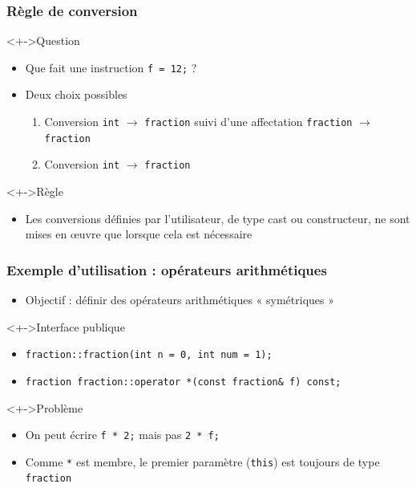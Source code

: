 \begin{frame}
\frametitle{Règle de conversion}
\begin{exampleblock}<+->{Question}
	\begin{itemize}[<+->]
	\item Que fait une instruction \texttt{f = 12;} ?
	\end{itemize}
\end{exampleblock}
\begin{itemize}[<+->]
\item Deux choix possibles
	\begin{enumerate}
	\item Conversion \lstinline|int| $\rightarrow$ \texttt{fraction} suivi d'une affectation \texttt{fraction} $\rightarrow$ \texttt{fraction}
	\item Conversion \lstinline|int| $\rightarrow$ \texttt{fraction}
	\end{enumerate}
\end{itemize}
\begin{alertblock}<+->{Règle}
	\begin{itemize}[<+->]
	\item Les conversions définies par l'utilisateur, de type cast ou constructeur, ne sont mises en œuvre que lorsque cela est nécessaire
	\end{itemize}
\end{alertblock}
\end{frame}

\begin{frame}
\frametitle{Exemple d'utilisation : opérateurs arithmétiques}
\begin{itemize}[<+->]
\item Objectif : définir des opérateurs arithmétiques « symétriques »
\end{itemize}
\begin{exampleblock}<+->{Interface publique}
	\begin{itemize}
	\item \scriptsize{\lstinline|fraction::fraction(int n = 0, int num = 1);|}
	\item \scriptsize{\lstinline|fraction fraction::operator *(const fraction& f) const;|}
	\end{itemize}
\end{exampleblock}
\begin{alertblock}<+->{Problème}
	\begin{itemize}[<+->]
	\item On peut écrire \texttt{f * 2;} mais pas \texttt{2 * f;}
	\item Comme \texttt{*} est membre, le premier paramètre (\lstinline|this|) est toujours de type \texttt{fraction}
	\end{itemize}
\end{alertblock}
\end{frame}

